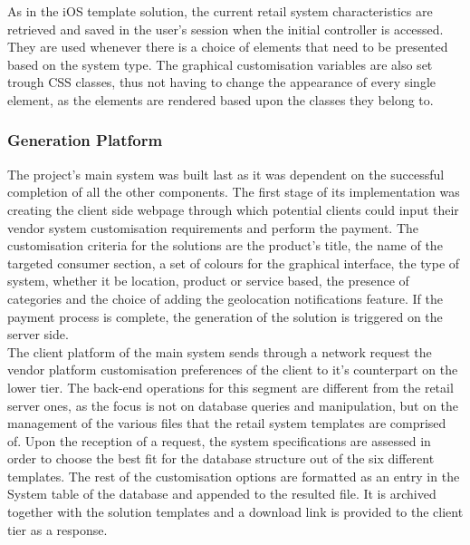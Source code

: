 As in the iOS template solution, the current retail system characteristics are retrieved and saved in the user's session when the initial controller is accessed. They are used whenever there is a choice of elements that need to be presented based on the system type. The graphical customisation variables are also set trough CSS classes, thus not having to change the appearance of every single element, as the elements are rendered based upon the classes they belong to.

\subsubsection{Generation Platform}

The project's main system was built last as it was dependent on the successful completion of all the other components. The first stage of its implementation was creating the client side webpage through which potential clients could input their vendor system customisation requirements and perform the payment. The customisation criteria for the solutions are the product's title, the name of the targeted consumer section, a set of colours for the graphical interface, the type of system, whether it be location, product or service based, the presence of categories and the choice of adding the geolocation notifications feature. If the payment process is complete, the generation of the solution is triggered on the server side.\\

The client platform of the main system sends through a network request the vendor platform customisation preferences of the client to it's counterpart on the lower tier. The back-end operations for this segment are different from the retail server ones, as the focus is not on database queries and manipulation, but on the management of the various files that the retail system templates are comprised of. Upon the reception of a request, the system specifications are assessed in order to choose the best fit for the database structure out of the six different templates. The rest of the customisation options are formatted as an entry in the System table of the database and appended to the resulted file. It is archived together with the solution templates and a download link is provided to the client tier as a response.\\

